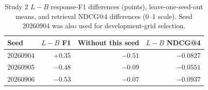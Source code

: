\begin{table}[htbp]\centering\small
\caption{Study 2 $L-B$ response-F1 differences (points), leave-one-seed-out means, and retrieval NDCG@4 differences (0--1 scale). Seed 20260904 was also used for development-grid selection.}\label{tab:seeds}
\begin{tabular}{lrrr}\toprule
Seed & $L-B$ F1 & Without this seed & $L-B$ NDCG@4\\\midrule
20260904 & $+0.35$ & $-0.51$ & $-0.0827$\\
20260905 & $-0.48$ & $-0.09$ & $-0.0551$\\
20260906 & $-0.53$ & $-0.07$ & $-0.0937$\\
\bottomrule\end{tabular}\end{table}
